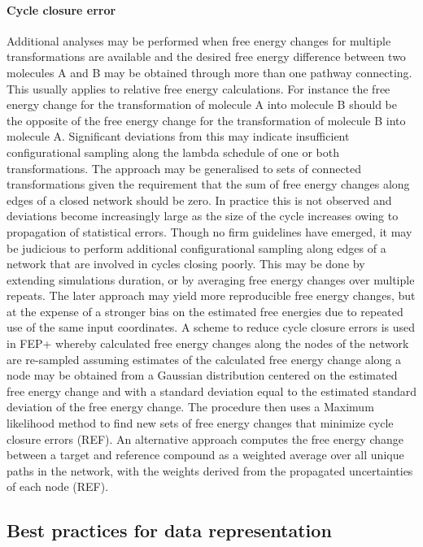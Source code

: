 \documentclass[9pt,bestpractices]{livecoms}
\begin{document}
\paragraph{Cycle closure error}
Additional analyses may be performed when free energy changes for multiple transformations are available and the desired free energy difference between two molecules A and B may be obtained through more than one pathway connecting. This usually applies to relative free energy calculations. 
For instance the free energy change for the transformation of molecule A into molecule B should be the opposite of the free energy change for the transformation of molecule B into molecule A. Significant deviations from this may indicate insufficient configurational sampling along the lambda schedule of one or both transformations. The approach may be generalised to sets of connected transformations given the requirement that the sum of free energy changes along edges of a closed network should be zero. In practice this is not observed and deviations become increasingly large as the size of the cycle increases owing to propagation of statistical errors. Though no firm guidelines have emerged, it may be judicious to perform additional configurational sampling along edges of a network that are involved in cycles closing poorly. This may be done by extending simulations duration, or by averaging free energy changes over multiple repeats. The later approach may yield more reproducible free energy changes, but at the expense of a stronger bias on the estimated free energies due to repeated use of the same input coordinates. 
A scheme to reduce cycle closure errors is used in FEP+ whereby calculated free energy changes along the nodes of the network are re-sampled assuming estimates of the calculated free energy change along a node may be obtained from a Gaussian distribution centered on the estimated free energy change and with a standard deviation equal to the estimated standard deviation of the free energy change. The procedure then uses a Maximum likelihood method to find new sets of free energy changes that minimize cycle closure errors (REF). An alternative approach computes the free energy change between a target and reference compound as a weighted average over all unique paths in the network, with the weights derived from the propagated uncertainties of each node (REF). 

\subsection*{Best practices for data representation}
\end{document}
